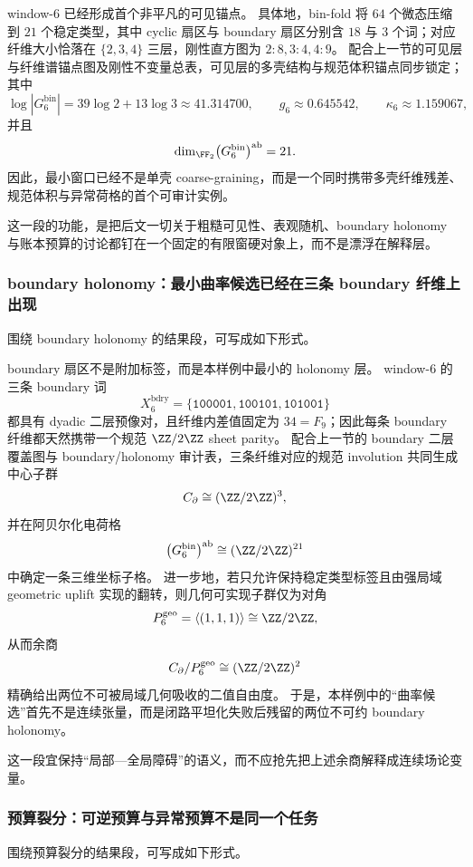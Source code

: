 window-\(6\) 已经形成首个非平凡的可见锚点。
具体地，bin-fold 将 \(64\) 个微态压缩到 \(21\) 个稳定类型，其中 cyclic 扇区与 boundary 扇区分别含 \(18\) 与 \(3\) 个词；对应纤维大小恰落在 \(\{2,3,4\}\) 三层，刚性直方图为 \(2{:}8,3{:}4,4{:}9\)。
配合上一节的可见层与纤维谱锚点图及刚性不变量总表，可见层的多壳结构与规范体积锚点同步锁定；其中
\[
\log|G_6^{\mathrm{bin}}|=39\log 2+13\log 3\approx 41.314700,
\qquad
g_6\approx 0.645542,
\qquad
\kappa_6\approx 1.159067,
\]
并且
\[
\dim_{\FF_2}\bigl(G_6^{\mathrm{bin}}\bigr)^{\mathrm{ab}}=21.
\]
因此，最小窗口已经不是单壳 coarse-graining，而是一个同时携带多壳纤维残差、规范体积与异常荷格的首个可审计实例。

这一段的功能，是把后文一切关于粗糙可见性、表观随机、boundary holonomy 与账本预算的讨论都钉在一个固定的有限窗硬对象上，而不是漂浮在解释层。

\subsubsection{boundary holonomy：最小曲率候选已经在三条 boundary 纤维上出现}\label{subsubsec:typed-address-biaxial-completion-window6-results-boundary-holonomy}
围绕 boundary holonomy 的结果段，可写成如下形式。

boundary 扇区不是附加标签，而是本样例中最小的 holonomy 层。
window-\(6\) 的三条 boundary 词
\[
X_6^{\mathrm{bdry}}=\{\texttt{100001},\texttt{100101},\texttt{101001}\}
\]
都具有 dyadic 二层预像对，且纤维内差值固定为 \(34=F_9\)；因此每条 boundary 纤维都天然携带一个规范 \(\ZZ/2\ZZ\) sheet parity。
配合上一节的 boundary 二层覆盖图与 boundary/holonomy 审计表，三条纤维对应的规范 involution 共同生成中心子群
\[
C_{\partial}\cong (\ZZ/2\ZZ)^3,
\]
并在阿贝尔化电荷格
\[
\bigl(G_6^{\mathrm{bin}}\bigr)^{\mathrm{ab}}\cong (\ZZ/2\ZZ)^{21}
\]
中确定一条三维坐标子格。
进一步地，若只允许保持稳定类型标签且由强局域 geometric uplift 实现的翻转，则几何可实现子群仅为对角
\[
P_6^{\mathrm{geo}}=\langle(1,1,1)\rangle\cong \ZZ/2\ZZ,
\]
从而余商
\[
C_{\partial}/P_6^{\mathrm{geo}}\cong (\ZZ/2\ZZ)^2
\]
精确给出两位不可被局域几何吸收的二值自由度。
于是，本样例中的“曲率候选”首先不是连续张量，而是闭路平坦化失败后残留的两位不可约 boundary holonomy。

这一段宜保持“局部—全局障碍”的语义，而不应抢先把上述余商解释成连续场论变量。

\subsubsection{预算裂分：可逆预算与异常预算不是同一个任务}\label{subsubsec:typed-address-biaxial-completion-window6-results-budget-split}
围绕预算裂分的结果段，可写成如下形式。

